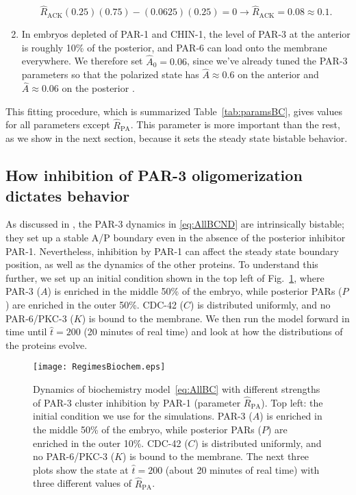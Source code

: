 \documentclass[11pt]{article}
\newcommand{\6}[1]{#1_{\text{6}}}
\newcommand{\3}[1]{#1_{\text{3}}}
\begin{document}
\begin{enumerate}
\begin{equation*}
\hat{R}_\text{ACK}(0.25)(0.75)- (0.0625)(0.25)=0 \rightarrow \hat{R}_\text{ACK}=0.08\approx 0.1.
\end{equation*}
\item In embryos depleted of PAR-1 and CHIN-1, the level of PAR-3 at the anterior is roughly 10\% of the posterior, and PAR-6 can load onto the membrane everywhere. We therefore set $\hat A_0=0.06$, since we've already tuned the PAR-3 parameters so that the polarized state has $\hat A \approx 0.6$ on the anterior and $\hat A \approx 0.06$ on the posterior \cite{lang2023oligomerization}.
\end{enumerate}
This fitting procedure, which is summarized Table\ \ref{tab:paramsBC}, gives values for all parameters except $\hat R_\text{PA}$. This parameter is more important than the rest, as we show in the next section, because it sets the steady state bistable behavior.

\subsection{How inhibition of PAR-3 oligomerization dictates behavior}
As discussed in \cite{lang2023oligomerization}, the PAR-3 dynamics in \eqref{eq:AllBCND} are intrinsically bistable; they set up a stable A/P boundary even in the absence of the posterior inhibitor PAR-1. Nevertheless, inhibition by PAR-1 can affect the steady state boundary position, as well as the dynamics of the other proteins.  To understand this further, we set up an initial condition shown in the top left of Fig.\ \ref{fig:BCRegimes}, where PAR-3 ($A$) is enriched in the middle 50\% of the embryo, while posterior PARs ($P$) are enriched in the outer 50\%. CDC-42 ($C$) is distributed uniformly, and no PAR-6/PKC-3 ($K$) is bound to the membrane. We then run the model forward in time until $\hat t = 200$ (20 minutes of real time) and look at how the distributions of the proteins evolve. 

\begin{figure}
\centering
\texttt{[image: RegimesBiochem.eps]}
\caption{\label{fig:BCRegimes}Dynamics of biochemistry model\ \eqref{eq:AllBC} with different strengths of PAR-3 cluster inhibition by PAR-1 (parameter $\hat R_\text{PA}$). Top left: the initial condition we use for the simulations. PAR-3 ($A$) is enriched in the middle 50\% of the embryo, while posterior PARs ($P$) are enriched in the outer 10\%. CDC-42 ($C$) is distributed uniformly, and no PAR-6/PKC-3 ($K$) is bound to the membrane. The next three plots show the state at $\hat t = 200$ (about 20 minutes of real time) with three different values of $\hat R_\text{PA}$. }
\end{figure}
\end{document}
